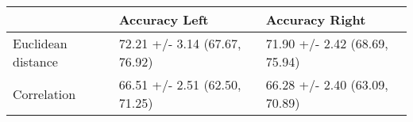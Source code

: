 \begin{tabular}{lll}
\toprule
{} &                  Accuracy Left &                 Accuracy Right \\
\midrule
Euclidean distance &  72.21 +/- 3.14 (67.67, 76.92) &  71.90 +/- 2.42 (68.69, 75.94) \\
Correlation        &  66.51 +/- 2.51 (62.50, 71.25) &  66.28 +/- 2.40 (63.09, 70.89) \\
\bottomrule
\end{tabular}
